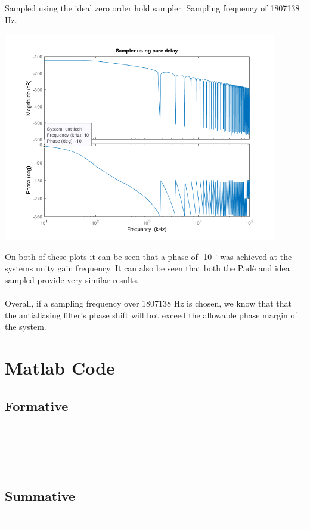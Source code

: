 \documentclass[a4paper,11pt]{article}
\begin{document}
\begin{preview}
\begin{enumerate}
Sampled using the ideal zero order hold sampler. Sampling frequency of 1807138 Hz.
\begin{center}
  \includegraphics[width=0.9\textwidth]{Summative/butterworth_sample.png}
\end{center}

On both of these plots it can be seen that a phase of -10 $^\circ$ was achieved at the systems unity gain frequency. It can also be seen that both the  Pad\`{e} and idea sampled provide very similar results.\\\\

Overall, if a sampling frequency over 1807138 Hz is chosen, we know that that the antialiasing filter's phase shift will bot exceed the allowable phase margin of the system.  \\

\end{enumerate}

\section*{Matlab Code}

\subsection*{Formative}
  \hrule  
  
  \hrule 

\subsection*{\\\\Summative}
\hrule 

\hrule 

\end{preview}
\end{document}

